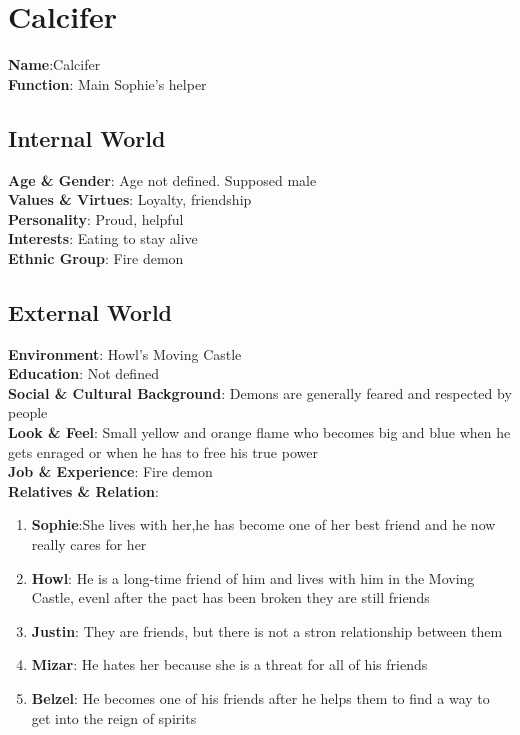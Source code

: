 \section{Calcifer}

\textbf{Name}:Calcifer \\
\textbf{Function}: Main Sophie's helper

\subsection{Internal World}

\textbf{Age \& Gender}: Age not defined. Supposed male \\
\textbf{Values \& Virtues}: Loyalty, friendship\\
\textbf{Personality}: Proud, helpful \\
\textbf{Interests}: Eating to stay alive\\
\textbf{Ethnic Group}: Fire demon

\subsection{External World}
\textbf{Environment}: Howl’s Moving Castle \\
\textbf{Education}: Not defined \\
\textbf{Social \& Cultural Background}: Demons are generally feared and respected by people \\
\textbf{Look \& Feel}: Small yellow and orange flame who becomes big and  blue when he gets enraged or when he has to free his true power\\
\textbf{Job \& Experience}: Fire demon \\
\textbf{Relatives \& Relation}:
\begin{enumerate}
\item \textbf{Sophie}:She lives with her,he has become one of her best friend and he now really cares for her
\item \textbf{Howl}: He is a long-time friend of him and lives with him in the Moving Castle, evenl after the pact has been broken they are still friends
\item \textbf{Justin}: They are friends, but there is not a stron relationship between them
\item \textbf{Mizar}: He hates her because she is a threat for all of his friends
\item \textbf{Belzel}: He becomes one of his friends after he helps them to find a way to get into the reign of spirits
\end{enumerate}

